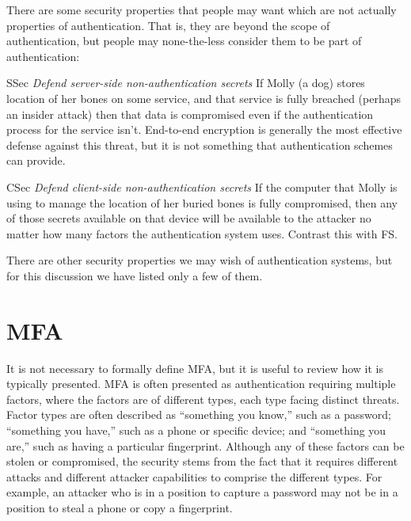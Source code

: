 \documentclass[12pt]{article}
\newcommand{\propdescription}[1]{\textit{#1}\hspace*{\fill}\linebreak }
\newcommand{\prop}[1]{\textsf{#1}}
\begin{document}
There are some security properties that people may want which are not actually properties of authentication. That is, they are beyond the scope of authentication, but people may none-the-less consider them to be part of authentication:


\begin{desiderata}
  \item[SSec] \propdescription{Defend server-side non-authentication secrets}
    If Molly (a dog) stores location of her bones on some service,
    and that service is fully breached (perhaps an insider attack)
    then that data is compromised even if the authentication process for the service isn't.
    End-to-end encryption is generally the most effective defense against this threat,
    but it is not something that authentication schemes can provide.

  \item[CSec] \propdescription{Defend client-side non-authentication secrets}
    If the computer that Molly is using to manage the location of her buried bones is fully compromised,
    then any of those secrets available on that device will be available to the attacker no matter how many factors the authentication system uses.
    Contrast this with \prop{FS}.
  
\end{desiderata}

There are other security properties we may wish of authentication systems, but for this discussion we have listed only a few of them.

\section{MFA}

It is not necessary to formally define MFA, but it is useful to review how it is typically presented.
MFA is often presented as authentication requiring multiple factors, where the factors are of different types, each type facing distinct threats.
Factor types are often described as “something you know,” such as a password;
“something you have,” such as a phone or specific device;
and “something you are,” such as having a particular fingerprint.
Although any of these factors can be stolen or compromised,
the security stems from the fact that it requires different attacks and different attacker capabilities to comprise the different types.
For example, an attacker who is in a position to capture a password may not be in a position to steal a phone or copy a fingerprint.
\end{document}
